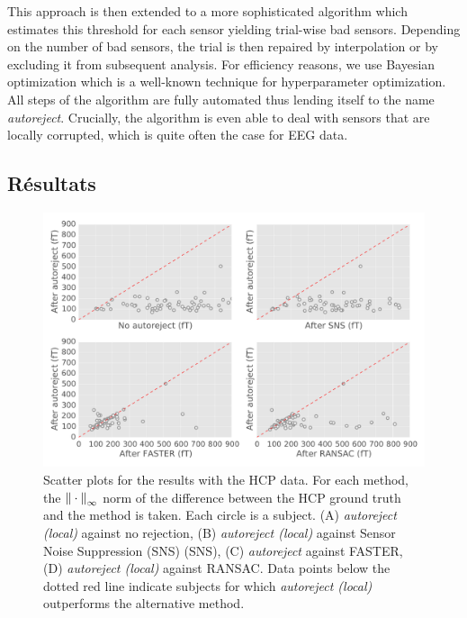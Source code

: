 This approach is then extended to a more sophisticated algorithm which estimates this threshold for each sensor yielding trial-wise bad sensors. Depending on the number of bad sensors, the trial is then repaired by interpolation or by excluding it from subsequent analysis. For efficiency reasons, we use Bayesian optimization which is a well-known technique for hyperparameter optimization. All steps of the algorithm are fully automated thus lending itself to the name \emph{autoreject}. Crucially, the algorithm is even able to deal with sensors that are locally corrupted, which is quite often the case for \ac{EEG} data.

\subsection*{Résultats}

\begin{figure}[htb]
    \centering
    \includegraphics[width=\linewidth]{figures/figure4.pdf}
    \caption[]{Scatter plots for the results with the HCP data. For each method, the ${\| \cdot \|}_{\mathrm{\infty}}$ norm of the difference between the HCP ground truth and the method is taken. Each circle is a subject. (A) \textit{autoreject (local)} against no rejection, (B) \textit{autoreject (local)} against Sensor Noise Suppression (SNS) (SNS), (C) \textit{autoreject} against FASTER, (D) \textit{autoreject (local)} against RANSAC. Data points below the dotted red line indicate subjects for which \textit{autoreject (local)} outperforms the alternative method.}
    \label{fig:sommaire:hcp_scatter}
\end{figure}

